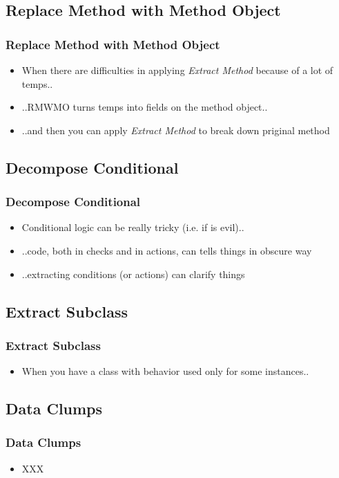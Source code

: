 \documentclass{beamer}
\begin{document}
\subsection{Replace Method with Method Object}
\begin{frame}
  \frametitle{Replace Method with Method Object}
  \begin{itemize}
	\item<+-> When there are difficulties in applying \textit{Extract Method} because of a lot of temps..
	\item<+-> ..RMWMO turns temps into fields on the method object.. 
	\item<+-> ..and then you can apply \textit{Extract Method} to break down priginal method
  \end{itemize}
\end{frame}

\subsection{Decompose Conditional}
\begin{frame}
  \frametitle{Decompose Conditional}
  \begin{itemize}
	\item<+-> Conditional logic can be really tricky (i.e. if is evil)..
	\item<+-> ..code, both in checks and in actions, can tells things in obscure way 
	\item<+-> ..extracting conditions (or actions) can clarify things
  \end{itemize}
\end{frame}

\subsection{Extract Subclass}
\begin{frame}
  \frametitle{Extract Subclass}
  \begin{itemize}
	\item<+-> When you have a class with behavior used only for some instances..
  \end{itemize}
\end{frame}

\subsection{Data Clumps}
\begin{frame}
  \frametitle{Data Clumps}
  \begin{itemize}
	\item<+-> XXX
  \end{itemize}
\end{frame}
\end{document}

